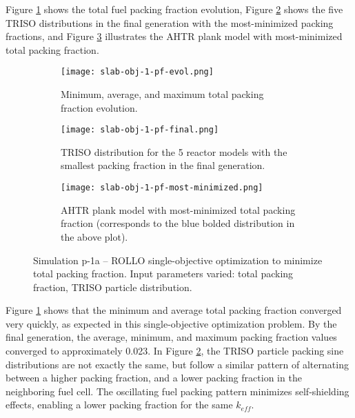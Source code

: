 Figure \ref{fig:slab-obj-1-pf-evol} shows the total fuel packing fraction evolution,  
Figure \ref{fig:slab-obj-1-pf-final} shows the five TRISO distributions in 
the final generation with the most-minimized packing fractions, and 
Figure \ref{fig:slab-obj-1-pf-most-minimized} illustrates the \gls{AHTR} plank model 
with most-minimized total packing fraction.
\begin{figure}[htbp!]
    \centering
    \begin{subfigure}{0.95\textwidth}
        \texttt{[image: slab-obj-1-pf-evol.png]}
        \caption{Minimum, average, and maximum total packing fraction evolution.}
        \label{fig:slab-obj-1-pf-evol} 
    \end{subfigure}
    \begin{subfigure}{0.95\textwidth}
        \texttt{[image: slab-obj-1-pf-final.png]}
        \caption{TRISO distribution for the 5 reactor models with the 
        smallest packing fraction in the final generation.}
        \label{fig:slab-obj-1-pf-final} 
    \end{subfigure}
    \begin{subfigure}{0.95\textwidth}
        \texttt{[image: slab-obj-1-pf-most-minimized.png]}
        \caption{\gls{AHTR} plank model with most-minimized total packing fraction 
        (corresponds to the blue bolded distribution in the above plot).}
        \label{fig:slab-obj-1-pf-most-minimized} 
    \end{subfigure}
    \caption{Simulation p-1a -- ROLLO single-objective optimization to minimize total 
    packing fraction. Input parameters varied: total packing fraction, TRISO particle 
    distribution.}
    \label{fig:slab-obj-1-pf}
\end{figure}

Figure \ref{fig:slab-obj-1-pf-evol} shows that the minimum and average total packing 
fraction converged very quickly, as expected in this single-objective optimization 
problem.
By the final generation, the average, minimum, and maximum packing fraction
values converged to approximately 0.023. 
In Figure \ref{fig:slab-obj-1-pf-final}, the TRISO particle packing 
sine distributions are not exactly the same, but follow a similar pattern of 
alternating between a higher packing fraction, and a lower packing fraction 
in the neighboring fuel cell. 
The oscillating fuel packing pattern minimizes self-shielding effects, enabling  
a lower packing fraction for the same $k_{eff}$. 

